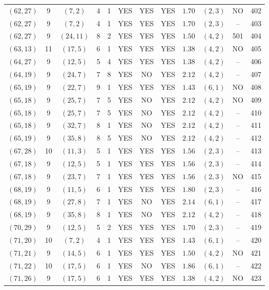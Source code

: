 \begin{longtable}{|c|c|c|c|c|c|c|c|c|c|c|c|}
$(62,27)$ & 9 & $(7,2)$ & 4 & 1 & YES & YES & YES & $1.70$ & $(2,3)$ & NO & 402\\
$(62,27)$ & 9 & $(7,2)$ & 4 & 1 & YES & YES & YES & $1.70$ & $(2,3)$ & -- & 403\\
$(62,27)$ & 9 & $(24,11)$ & 8 & 2 & YES & YES & YES & $1.50$ & $(4,2)$ & 501 & 404\\
$(63,13)$ & 11 & $(17,5)$ & 6 & 1 & YES & YES & YES & $1.38$ & $(4,2)$ & NO & 405\\
$(64,27)$ & 9 & $(12,5)$ & 5 & 4 & YES & YES & YES & $1.38$ & $(4,2)$ & -- & 406\\
$(64,19)$ & 9 & $(24,7)$ & 7 & 8 & YES & NO & YES & $2.12$ & $(4,2)$ & -- & 407\\
$(65,19)$ & 9 & $(22,7)$ & 9 & 1 & YES & YES & YES & $1.43$ & $(6,1)$ & NO & 408\\
$(65,18)$ & 9 & $(25,7)$ & 7 & 5 & YES & NO & YES & $2.12$ & $(4,2)$ & NO & 409\\
$(65,18)$ & 9 & $(25,7)$ & 7 & 5 & YES & NO & YES & $2.12$ & $(4,2)$ & -- & 410\\
$(65,18)$ & 9 & $(32,7)$ & 8 & 1 & YES & NO & YES & $2.12$ & $(4,2)$ & -- & 411\\
$(65,19)$ & 9 & $(35,8)$ & 8 & 5 & YES & NO & YES & $2.12$ & $(4,2)$ & -- & 412\\
$(67,28)$ & 10 & $(11,3)$ & 5 & 1 & YES & YES & YES & $1.56$ & $(2,3)$ & -- & 413\\
$(67,18)$ & 9 & $(12,5)$ & 5 & 1 & YES & YES & YES & $1.56$ & $(2,3)$ & -- & 414\\
$(67,18)$ & 9 & $(23,7)$ & 7 & 1 & YES & YES & YES & $1.56$ & $(2,3)$ & NO & 415\\
$(68,19)$ & 9 & $(11,5)$ & 6 & 1 & YES & YES & YES & $1.80$ & $(2,3)$ & -- & 416\\
$(68,19)$ & 9 & $(27,8)$ & 7 & 1 & YES & NO & YES & $2.14$ & $(6,1)$ & -- & 417\\
$(68,19)$ & 9 & $(35,8)$ & 8 & 1 & YES & NO & YES & $2.12$ & $(4,2)$ & -- & 418\\
$(70,29)$ & 9 & $(12,5)$ & 5 & 2 & YES & YES & YES & $1.70$ & $(2,3)$ & -- & 419\\
$(71,20)$ & 10 & $(7,2)$ & 4 & 1 & YES & YES & YES & $1.43$ & $(6,1)$ & -- & 420\\
$(71,21)$ & 9 & $(14,5)$ & 6 & 1 & YES & YES & YES & $1.50$ & $(4,2)$ & NO & 421\\
$(71,22)$ & 10 & $(17,5)$ & 6 & 1 & YES & NO & YES & $1.86$ & $(6,1)$ & -- & 422\\
$(71,26)$ & 9 & $(17,5)$ & 6 & 1 & YES & YES & YES & $1.38$ & $(4,2)$ & NO & 423\\

\end{longtable}
